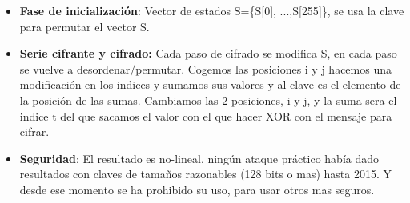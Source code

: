 \documentclass[12pt, twoside, openright]{report} %
\begin{document}
\begin{itemize}
\begin{itemize}
      \begin{itemize}
      \item \textbf{Fase de inicialización}: Vector de estados S=\{S{[}0{]},
        ...,S{[}255{]}\}, se usa la clave para permutar el vector S.
        
      \item \textbf{Serie cifrante y cifrado:} Cada paso de cifrado se
        modifica S, en cada paso se vuelve a desordenar/permutar.
        Cogemos las posiciones i y j hacemos una modificación en los
        indices y sumamos sus valores y al clave es el elemento de la
        posición de las sumas. Cambiamos las 2 posiciones, i y j, y la
        suma sera el indice t del que sacamos el valor con el que hacer
        XOR con el mensaje para cifrar.
        
      \item \textbf{Seguridad}: El resultado es no-lineal, ningún ataque
        práctico había dado resultados con claves de tamaños razonables
        (128 bits o mas) hasta 2015. Y desde ese momento se ha prohibido
        su uso, para usar otros mas seguros.
        
      \end{itemize}
    \end{itemize}
  \end{itemize}
\end{document}
